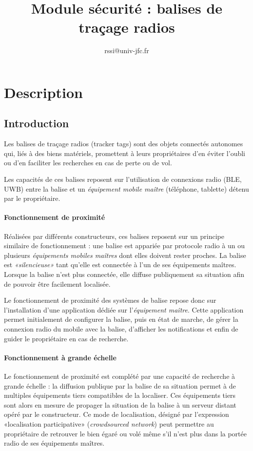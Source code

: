 \documentclass[headings=small,cmyk,french,a4paper,twocolumn,garamond,11pt]{scrartcl}
\title{Module sécurité : balises de traçage radios}\date{}
\author{rssi@univ-jfc.fr}
\begin{document}
\maketitle{}
\section{Description}
\subsection{Introduction}
Les balises de traçage radios (tracker tags)  sont des objets connectés
autonomes qui, liés à des biens matériels, promettent à leurs
propriétaires d'en éviter l'oubli ou d'en faciliter les recherches en
cas de perte ou de vol.

Les capacités de ces balises reposent sur l'utilisation de connexions
radio (\acrshort{BLE},  \acrshort{UWB}) entre la balise et un
\emph{équipement mobile maître} (téléphone, tablette) détenu par le  propriétaire.

\paragraph{Fonctionnement de proximité}
Réalisées par différents constructeurs, ces balises reposent sur un
principe similaire de fonctionnement : une balise est appariée par
protocole radio à un ou plusieurs \emph{équipements mobiles maîtres} dont
elles doivent rester proches. La balise est \textsl{«silencieuse»}
tant qu'elle est connectée à l'un de ses équipements maîtres.  Lorsque
la balise n'est plus connectée, elle diffuse publiquement sa situation
afin de pouvoir être facilement localisée.

Le fonctionnement de proximité des systèmes de balise repose donc sur
l'installation d'une application dédiée sur l'\emph{équipement maître}. Cette
application permet initialement de configurer la balise, puis en état
de marche, de gérer la connexion radio du mobile avec la balise,
d'afficher les notifications et enfin de guider le propriétaire en cas
de recherche.
\paragraph{Fonctionnement à grande échelle}
Le fonctionnement de proximité est complété par une capacité de
recherche à grande échelle : la diffusion publique par la balise de sa
situation permet à de multiples équipements tiers compatibles de la
localiser. Ces équipements tiers sont alors en mesure de propager la
situation de la balise à un serveur distant opéré par le
constructeur. Ce mode de localisation, désigné par l'expression
«localisation participative» (\emph{crowdsourced network}) peut
permettre au propriétaire de retrouver le bien égaré ou volé même s'il
n'est plus dans la portée radio de ses équipements maîtres.
\end{document}
